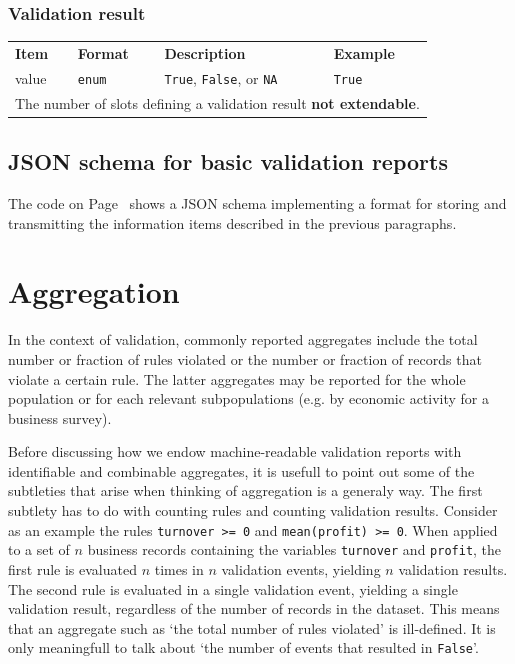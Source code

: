 \documentclass[a4paper, 11pt,titlepage]{article}
\newcommand{\code}[1]{\texttt{#1}}
\newcommand{\waar}{{\normalfont \texttt{True}}}
\newcommand{\onwaar}{{\normalfont \texttt{False}}}
\newcommand{\na}{{\normalfont \texttt{NA}}}
\begin{document}
\subsubsection{Validation result}

\begin{center}
\begin{tabular}{|lp{15mm}p{}p{}|}
\hline
\textbf{Item} & \textbf{Format} & \textbf{Description} &\textbf{Example}\\
value  & \code{enum} & \waar{}, \onwaar{}, or \na{}    &\waar{}\\
\hline
\multicolumn{4}{|l|}{The number of slots defining a validation result \textbf{not extendable}.
}\\
\hline
\end{tabular}
\end{center}

\subsection{JSON schema for basic validation reports}
The code on Page~\pageref{code:basicreport} shows a JSON schema implementing
a format for storing and transmitting the information items described in the previous
paragraphs. 

\newpage
\label{code:basicreport}


\section{Aggregation}
In the context of validation, commonly reported aggregates include the total
number or fraction of rules violated or the number or fraction of records  that
violate a certain rule. The latter aggregates may be reported for the whole
population or for each relevant subpopulations (e.g. by economic activity for a
business survey). 


Before discussing how we endow machine-readable validation reports with
identifiable and combinable aggregates, it is usefull to point out some of the
subtleties that arise when thinking of aggregation is a generaly way. The first
subtlety has to do with counting rules and counting validation results.
Consider as an example the rules \code{turnover >= 0} and \code{mean(profit) >=
0}.  When applied to a set of $n$ business records containing the variables
\code{turnover} and \code{profit}, the first rule is evaluated $n$ times in $n$
validation events, yielding $n$ validation results. The second rule is
evaluated in a single validation event, yielding a single validation result,
regardless of the number of records in the dataset. This means that an
aggregate such as `the total number of rules violated' is ill-defined. It is
only meaningfull to talk about `the number of events that resulted in
\onwaar{}'. 
\end{document}
